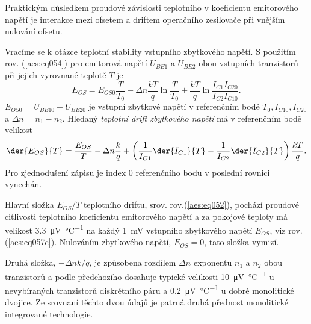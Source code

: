         Praktickým důsledkem proudové závislosti teplotního v koeficientu emitorového napětí je
        interakce mezi ofsetem a driftem operačního zesilovače při vnějším nulování ofsetu.

        Vracíme se k otázce teplotní stability vstupního zbytkového napětí. S použitím rov.
        (\ref{aes:eq054}) pro emitorová napětí \(U_{BE1}\) a \(U_{BE2}\) obou vstupních tranzistorů
        při jejich vyrovnané teplotě \(T\) je
        \begin{equation}\label{aes:eq058}
          E_{OS} = E_{OS0}\dfrac{T}{T_0} - \Delta n\dfrac{kT}{q}\ln\dfrac{T}{T_0} +
                   \dfrac{kT}{q}\ln\dfrac{I_{C1}I_{C20}}{I_{C2}I_{C10}}.    
        \end{equation}
        \(E_{OS0} = U_{BE10} - U_{BE20}\) je vstupní zbytkové napětí v referenčním bodě \(T_0,
        I_{C10}, I_{C20}\) a \(\Delta n = n_1 - n_2\). Hledaný \emph{teplotní drift zbytkového
        napětí} má v referenčním bodě velikost
        \begin{equation}\label{aes:eq059}
          \der{E_{OS}}{T} = \dfrac{E_{OS}}{T} - \Delta n\dfrac{k}{q} + 
                           \left(\dfrac{1}{I_{C1}}\der{I_{C1}}{T} -
                                 \dfrac{1}{I_{C2}}\der{I_{C2}}{T}
                           \right)\dfrac{kT}{q}.
        \end{equation}  
        Pro zjednodušení zápisu je index 0 referenčního bodu v poslední rovnici vynechán.

        Hlavní složka \(E_{OS}/T\) teplotního driftu, srov. rov.(\ref{aes:eq052}), pochází proudové
        citlivosti teplotního koeficientu emitorového napětí a za pokojové teploty má velikost
        \qty{3.3}{\uV\per\degreeCelsius} na každý \qty{1}{\mV} vstupního zbytkového napětí \(E_{OS}\),
        viz rov. (\ref{aes:eq057c}). Nulováním zbytkového napětí, \(E_{OS} = 0\), tato složka
        vymizí.

        Druhá složka, \(-\Delta nk/q\), je způsobena rozdílem \(\Delta n\) exponentu \(n_1\) a
        \(n_2\) obou tranzistorů a podle předchozího dosahuje typické velikosti
        \qty{10}{\uV\per\degreeCelsius} u nevybíraných tranzistorů diskrétního páru a
        \qty{0.2}{\uV\per\degreeCelsius} u dobré monolitické dvojice. Ze srovnaní těchto dvou údajů
        je patrná druhá přednost monolitické integrované technologie.

